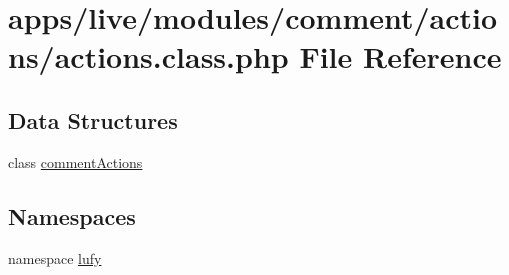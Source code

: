 \hypertarget{live_2modules_2comment_2actions_2actions_8class_8php}{\section{apps/live/modules/comment/actions/actions.class.\-php File Reference}
\label{live_2modules_2comment_2actions_2actions_8class_8php}
}
\subsection*{Data Structures}
\begin{DoxyCompactItemize}
\item 
class \hyperlink{classcomment_actions}{comment\-Actions}
\end{DoxyCompactItemize}
\subsection*{Namespaces}
\begin{DoxyCompactItemize}
\item 
namespace \hyperlink{namespacelufy}{lufy}
\end{DoxyCompactItemize}
